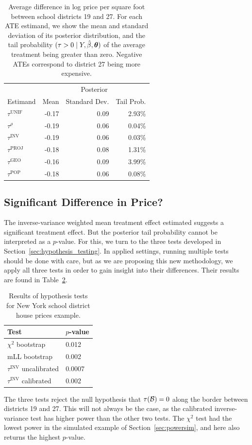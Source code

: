 \documentclass[letter]{article}
\DeclarePairedDelimiter{\parenthesis}{\lparen}{\rparen}
\newcommand{\del}[1]{\parenthesis*{#1}}
\let\Pr\relax
\DeclareMathOperator{\Pr}{\mathbb{P}}
\newcommand{\border}{\mathcal{B}}
\newcommand{\unifavg}{\tau^{\mathrm{UNIF}}}
\newcommand{\invvar}{\tau^{\mathrm{INV}}}
\newcommand{\taurho}{\tau^{\rho}}
\newcommand{\tauproj}{\tau^{\mathrm{PROJ}}}
\newcommand{\taugeo}{\tau^{\mathrm{GEO}}}
\newcommand{\taupop}{\tau^{\mathrm{POP}}}
\newcommand{\hyperparam}{\bm{\theta}}
\begin{document}
\begin{table}
\centering
\begin{tabular}{lrrr}
\hline
& \multicolumn{3}{c}{Posterior} \\
    Estimand & Mean & Standard Dev. & Tail Prob. \\
    \hline
$\unifavg$ & -0.17 & 0.09 & 2.93\% \\
$\taurho$  & -0.19 & 0.06 & 0.04\% \\
$\invvar$  & -0.19 & 0.06 & 0.03\% \\
$\tauproj$ & -0.18 & 0.08 & 1.31\% \\
$\taugeo$  & -0.16 & 0.09 & 3.99\% \\
$\taupop$  & -0.18 & 0.06 & 0.08\% \\
\hline
\end{tabular}
\label{table:NYC_ate}
\caption{Average difference in log price per square foot between school districts 19 and 27. For each ATE estimand, we show the mean and standard deviation of its posterior distribution, and the tail probability $\Pr(\tau > 0 \mid Y, \hat{\beta}, \hyperparam)$ of the average treatment being greater than zero. Negative ATEs correspond to district 27 being more expensive.}
\end{table}
    	\subsection{Significant Difference in Price?}\label{significant-difference-in-price}

The inverse-variance weighted mean treatment effect estimated suggests a significant treatment effect.
But the posterior tail probability cannot be interpreted as a \(p\)-value.
For this, we turn to the three tests developed in Section~\ref{sec:hypothesis_testing}.
In applied settings, running multiple tests should be done with care,
but as we are proposing this new methodology,
we apply all three tests in order to gain insight into their differences.
Their results are found in Table~\ref{table:NYC_tests}.
    

\begin{table}[]
\centering
\label{table:NYC_tests}
\begin{tabular}{ll}
\hline
Test                   & $p$-value \\
\hline
$\chi^2$ bootstrap     & 0.012     \\
mLL bootstrap          & 0.002     \\
$\invvar$ uncalibrated & 0.0007    \\
$\invvar$ calibrated   & 0.002    
\end{tabular}
\caption{Results of hypothesis tests for New York school district house prices example.}
\end{table}
    	The three tests reject the null hypothesis that \(\tau\del{\border}=0\) along the border between districts 19 and 27.
This will not always be the case, as the calibrated inverse-variance test has higher power than the other two tests.
The \(\chi^2\) test had the lowest power in the simulated example of Section~\ref{sec:powersim}, and here also returns the highest \(p\)-value.
    
\end{document}
